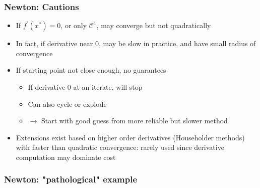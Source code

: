 \documentclass[bigger]{beamer}
\begin{document}
\begin{frame}%

\frametitle{Newton: Cautions}

\begin{itemize}

\item If  $f^{\prime}(x^*)=0$, or only $\mathcal{C}^1$, may converge but not quadratically
\item In fact, if derivative near 0, may be slow in practice, and have small radius of convergence

\item If starting point not close enough, no guarantees
\begin{itemize}
\item If derivative 0 at an iterate, will stop
\item Can also cycle or explode
\item $\to$ Start with good guess from more reliable but slower method 
\end{itemize}



\item Extensions exist based on higher order derivatives (Householder methods) with faster than quadratic convergence: rarely used since derivative computation may dominate cost


\end{itemize}



\end{frame}%

\begin{frame}%

\frametitle{Newton: "pathological" example}


\end{frame}%
\end{document}
